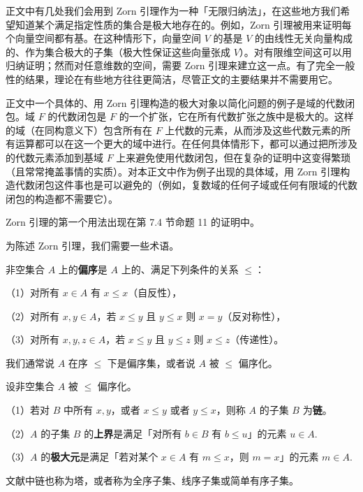 正文中有几处我们会用到 Zorn 引理作为一种「无限归纳法」，在这些地方我们希望知道某个满足指定性质的集合是极大地存在的。例如，Zorn 引理被用来证明每个向量空间都有基。在这种情形下，向量空间 \(V\) 的基是 \(V\) 的由线性无关向量构成的、作为集合极大的子集（极大性保证这些向量张成 \(V\)）。对有限维空间这可以用归纳证明；然而对任意维数的空间，需要 Zorn 引理来建立这一点。有了完全一般性的结果，理论在有些地方往往更简洁，尽管正文的主要结果并不需要用它。

正文中一个具体的、用 Zorn 引理构造的极大对象以简化问题的例子是域的代数闭包。域 \(F\) 的代数闭包是 \(F\) 的一个扩张，它在所有代数扩张之族中是极大的。这样的域（在同构意义下）包含所有在 \(F\) 上代数的元素，从而涉及这些代数元素的所有运算都可以在这一个更大的域中进行。在任何具体情形下，都可以通过把所涉及的代数元素添加到基域 \(F\) 上来避免使用代数闭包，但在复杂的证明中这变得繁琐（且常常掩盖事情的实质）。对本正文中作为例子出现的具体域，用 Zorn 引理构造代数闭包这件事也是可以避免的（例如，复数域的任何子域或任何有限域的代数闭包的构造都不需要它）。

Zorn 引理的第一个用法出现在第 7.4 节命题 11 的证明中。

为陈述 Zorn 引理，我们需要一些术语。

\begin{definition}
非空集合 \(A\) 上的\textbf{偏序}是 \(A\) 上的、满足下列条件的关系 \(\leq\)：

（1）对所有 \(x \in A\) 有 \(x \leq x\)（自反性），

（2）对所有 \(x, y \in A\)，若 \(x \leq y\) 且 \(y \leq x\) 则 \(x = y\)（反对称性），

（3）对所有 \(x, y, z \in A\)，若 \(x \leq y\) 且 \(y \leq z\) 则 \(x \leq z\)（传递性）。
\end{definition}

我们通常说 \(A\) 在序 \(\leq\) 下是偏序集，或者说 \(A\) 被 \(\leq\) 偏序化。

\begin{definition}
设非空集合 \(A\) 被 \(\leq\) 偏序化。

（1）若对 \(B\) 中所有 \(x, y\)，或者 \(x \leq y\) 或者 \(y \leq x\)，则称 \(A\) 的子集 \(B\) 为\textbf{链}。

（2）\(A\) 的子集 \(B\) 的\textbf{上界}是满足「对所有 \(b \in B\) 有 \(b \leq u\)」的元素 \(u \in A\).

（3）\(A\) 的\textbf{极大元}是满足「若对某个 \(x \in A\) 有 \(m \leq x\)，则 \(m = x\)」的元素 \(m \in A\).
\end{definition}

文献中链也称为塔，或者称为全序子集、线序子集或简单有序子集。


